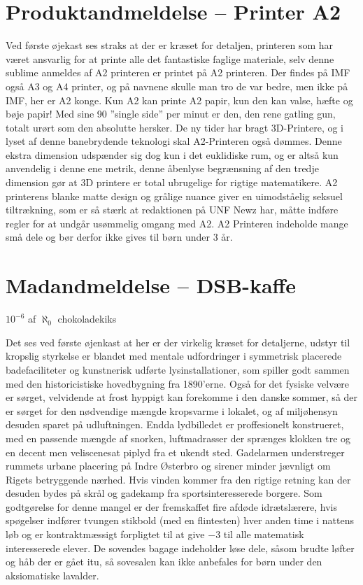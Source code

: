 \begin{minipage}[t]{100mm}
\vspace{1mm}
\section*{Produktandmeldelse -- Printer A2}
Ved første øjekast ses straks at der er kræset for detaljen, printeren som har været ansvarlig for at printe alle det fantastiske faglige materiale, selv denne sublime anmeldes af A2 printeren er printet på A2 printeren.  Der findes på IMF også A3 og A4 printer, og på navnene skulle man tro de var bedre, men ikke på IMF, her er A2 konge. Kun A2 kan printe A2 papir, kun den kan valse, hæfte og bøje papir! Med sine 90 ”single side” per minut er den, den rene gatling gun, totalt urørt som den absolutte hersker. De ny tider har bragt 3D-Printere, og i lyset af denne banebrydende teknologi skal A2-Printeren også dømmes. Denne ekstra dimension udspænder sig dog kun i det euklidiske rum, og er altså kun anvendelig i denne ene metrik, denne åbenlyse begrænsning af den tredje dimension gør at 3D printere er total ubrugelige for rigtige matematikere.  A2 printerens blanke matte design og grålige nuance giver en uimodståelig seksuel tiltrækning, som er så stærk at redaktionen på UNF Newz har, måtte indføre regler for at undgår usømmelig omgang med A2. 
A2 Printeren indeholde mange små dele og bør derfor ikke gives til børn under 3 år.

\vspace{1mm}
\section*{Madandmeldelse -- DSB-kaffe}
$10^{-6}$ af $\aleph_0$ chokoladekiks

Det ses ved første øjenkast at her er der virkelig kræset for detaljerne, udstyr til kropslig styrkelse er blandet med mentale udfordringer i symmetrisk placerede badefaciliteter og kunstnerisk udførte lysinstallationer, som spiller godt sammen med den historicistiske hovedbygning fra 1890'erne. Også for det fysiske velvære er sørget, velvidende at frost hyppigt kan forekomme i den danske sommer, så der er sørget for den nødvendige mængde kropsvarme i lokalet, og af miljøhensyn desuden sparet på udluftningen.
Endda lydbilledet er proffesionelt konstrueret, med en passende mængde af snorken, luftmadrasser der sprænges klokken tre og en decent men veliscenesat piplyd fra et ukendt sted. Gadelarmen understreger rummets urbane placering på Indre Østerbro og sirener minder jævnligt om Rigets betryggende nærhed. Hvis vinden kommer fra den rigtige retning kan der desuden bydes på skrål og gadekamp fra sportsinteresserede borgere. Som godtgørelse for denne mangel er der fremskaffet fire afdøde idrætslærere, hvis spøgelser indfører tvungen stikbold (med en flintesten) hver anden time i nattens løb og er kontraktmæssigt forpligtet til at give $-3$ til alle matematisk interesserede elever. 
De sovendes bagage indeholder løse dele, såsom brudte løfter og håb der er gået itu, så sovesalen kan ikke anbefales for børn under den aksiomatiske lavalder.

\end{minipage}

